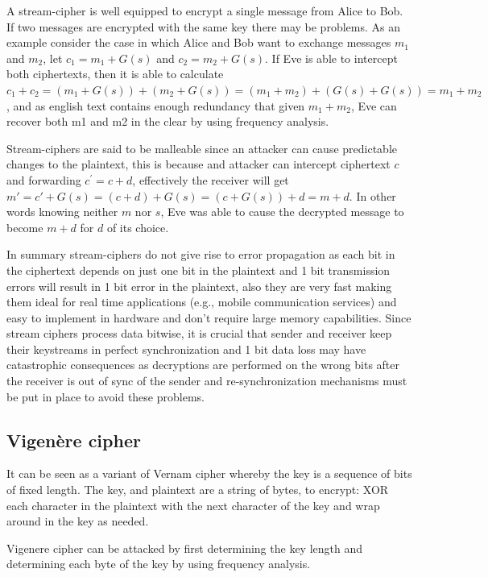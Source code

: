 A stream-cipher is well equipped to encrypt a single message from Alice to Bob. If two messages are encrypted with the same key there may be problems. As an example consider the case in which Alice and Bob want to exchange messages $m_1$ and $m_2$, let $c_1 = m_1 + G(s)$ and $c_2 = m_2 + G(s)$. If Eve is able to intercept both ciphertexts, then it is able to calculate $c_1 + c_2 = ( m_1 + G(s)) + (m_2 + G(s)) = (m_1 + m_2) + (G(s) + G(s)) = m_1 + m_2$, and as english text contains enough redundancy that given $m_1 + m_2$, Eve can recover both m1 and m2 in the clear by using frequency analysis.

Stream-ciphers are said to be malleable since an attacker can cause predictable changes to the plaintext, this is because and attacker can intercept ciphertext $c$ and forwarding $c^'=c+d$, effectively the receiver will get $m' = c' + G(s)= (c+d) + G(s) = (c+G(s)) + d = m + d$. In other words knowing neither $m$ nor $s$, Eve was able to cause the decrypted message to become $m + d $ for $d$ of its choice.

In summary stream-ciphers do not give rise to error propagation as each bit in the ciphertext depends on just one bit in the plaintext and 1 bit transmission errors will result in 1 bit error in the plaintext, also they are very fast making them ideal for real time applications (e.g., mobile communication services) and easy to implement in hardware and don't require large memory capabilities. Since stream ciphers process data bitwise, it is crucial that sender and receiver keep their keystreams in perfect synchronization and 1 bit data loss may have catastrophic consequences as decryptions are performed on the wrong bits after the receiver is out of sync of the sender and re-synchronization mechanisms must be put in place to avoid these problems.


\subsection{Vigenère cipher}

It can be seen as a variant of Vernam cipher whereby the key is a sequence of bits of fixed length. The key, and plaintext are a string of bytes, to encrypt: XOR each character in the plaintext with the next character of the key and wrap around in the key as needed.

Vigenere cipher can be attacked by first determining the key length and determining each byte of the key by using frequency analysis.

